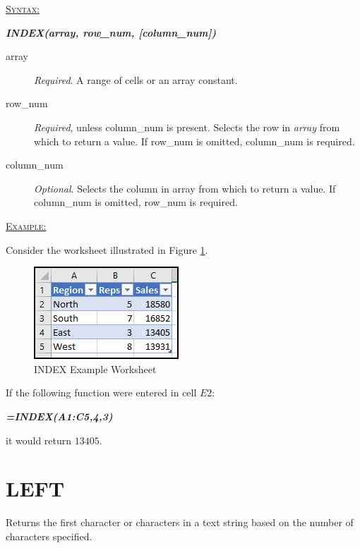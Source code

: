 \begin{addmargin}[1cm]{0cm}
	
	\medskip
	\underline{\textsc{Syntax:}}
	\medskip
	
	{\color{Syntax}
		\noindent\textbf{\textit{INDEX(array, row\_num, [column\_num])}}
	}
	
	\begin{description}
		\item[array] \textit{Required}. A range of cells or an array constant.
		\item[row\_num] \textit{Required}, unless column\_num is present. Selects the row in \textit{array} from which to return a value. If row\_num is omitted, column\_num is required.
		\item[column\_num] \textit{Optional}. Selects the column in array from which to return a value. If column\_num is omitted, row\_num is required. 
	\end{description}

	\medskip
	\noindent\underline{\textsc{Example:}}
	\medskip
	
	\noindent Consider the worksheet illustrated in Figure \ref{apa:idx}.
	
	\begin{figure}[H]
		\centering
		\includegraphics[width=\maxwidth{.45\linewidth}]{gfx/apa_fig01}
		\caption{INDEX Example Worksheet}
		\label{apa:idx}
	\end{figure}
	
	\noindent If the following function were entered in cell $ E2 $:
	
	{\color{Syntax}
		\textit{\textbf{=INDEX(A1:C5,4,3)}}
	}
	
	\noindent it would return $ 13405 $.

\end{addmargin}

\section{LEFT}

Returns the first character or characters in a text string based on the number of characters specified.

